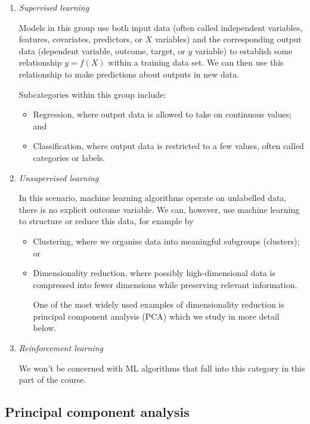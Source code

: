 \documentclass{scrartcl}
\providecommand{\tightlist}{%
      \setlength{\itemsep}{0pt}\setlength{\parskip}{0pt}}
\begin{document}
\begin{enumerate}
\def\labelenumi{\arabic{enumi}.}
\item
  \emph{Supervised learning}

  Models in this group use both input data (often called independent
  variables, features, covariates, predictors, or \(X\) variables) and
  the corresponding output data (dependent variable, outcome, target, or
  \(y\) variable) to establish some relationship \(y = f(X)\) within a
  training data set. We can then use this relationship to make
  predictions about outputs in new data.

  Subcategories within this group include:

  \begin{itemize}
  \tightlist
  \item
    Regression, where output data is allowed to take on continuous
    values; and
  \item
    Classification, where output data is restricted to a few values,
    often called categories or labels.
  \end{itemize}
\item
  \emph{Unsupervised learning}

  In this scenario, machine learning algorithms operate on unlabelled
  data, \ie there is no explicit outcome variable. We can, however,
  use machine learning to structure or reduce this data, for example by

  \begin{itemize}
  \item
    Clustering, where we organise data into meaningful subgroups
    (clusters); or
  \item
    Dimensionality reduction, where possibly high-dimensional data is
    compressed into fewer dimensions while preserving relevant
    information.

    One of the most widely used examples of dimensionality reduction is
    principal component analysis (PCA) which we study in more detail
    below.
  \end{itemize}
\item
  \emph{Reinforcement learning}

  We won't be concerned with ML algorithms that fall into this category
  in this part of the course.
\end{enumerate}


\hypertarget{principal-component-analysis}{%
\subsection{Principal component
analysis}\label{principal-component-analysis}}
\end{document}
